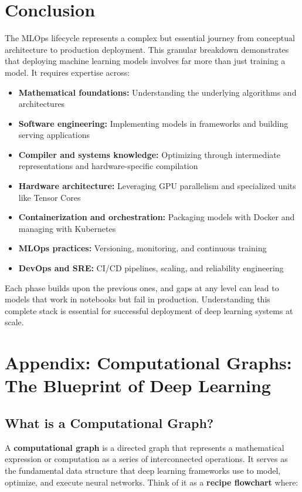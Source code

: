 \documentclass[11pt]{article}
\begin{document}
\section{Conclusion}

The MLOps lifecycle represents a complex but essential journey from conceptual architecture to production deployment. This granular breakdown demonstrates that deploying machine learning models involves far more than just training a model. It requires expertise across:

\begin{itemize}
    \item \textbf{Mathematical foundations:} Understanding the underlying algorithms and architectures
    \item \textbf{Software engineering:} Implementing models in frameworks and building serving applications
    \item \textbf{Compiler and systems knowledge:} Optimizing through intermediate representations and hardware-specific compilation
    \item \textbf{Hardware architecture:} Leveraging GPU parallelism and specialized units like Tensor Cores
    \item \textbf{Containerization and orchestration:} Packaging models with Docker and managing with Kubernetes
    \item \textbf{MLOps practices:} Versioning, monitoring, and continuous training
    \item \textbf{DevOps and SRE:} CI/CD pipelines, scaling, and reliability engineering
\end{itemize}

Each phase builds upon the previous ones, and gaps at any level can lead to models that work in notebooks but fail in production. Understanding this complete stack is essential for successful deployment of deep learning systems at scale.

\section{Appendix: Computational Graphs: The Blueprint of Deep Learning}

\subsection{What is a Computational Graph?}

A \textbf{computational graph} is a directed graph that represents a mathematical expression or computation as a series of interconnected operations. It serves as the fundamental data structure that deep learning frameworks use to model, optimize, and execute neural networks. Think of it as a \textbf{recipe flowchart} where:
\end{document}
